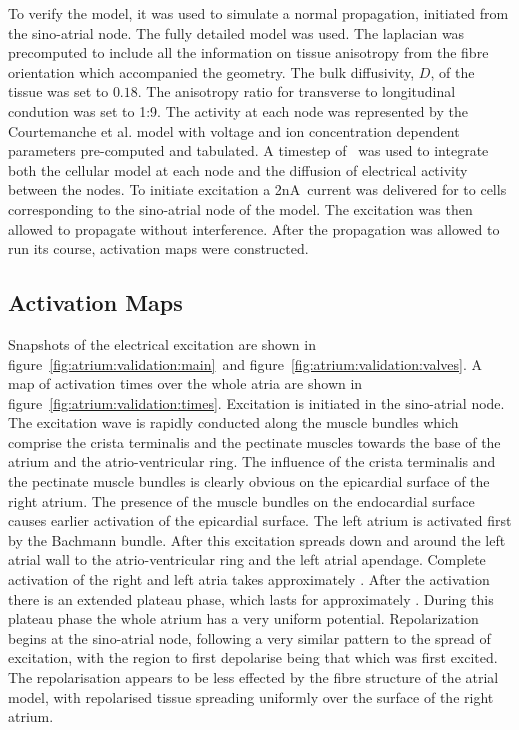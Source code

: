 To verify the model, it was used to simulate a normal propagation, initiated
from the sino-atrial node.
The fully detailed model was used.
The laplacian was precomputed to include all the information on tissue
anisotropy from the fibre orientation which accompanied the geometry.
The bulk diffusivity, $D$, of the tissue was set to $0.18$.
The anisotropy ratio for transverse to longitudinal condution was set to 1:9.
The activity at each node was represented by the Courtemanche et al. model with
voltage and ion concentration dependent parameters pre-computed and tabulated.
A timestep of \ was used to integrate both the cellular model at each
node and the diffusion of electrical activity between the nodes.
To initiate excitation a \unit{2}{nA}\ current was delivered for  to cells
corresponding to the sino-atrial node of the model.
The excitation was then allowed to propagate without interference.
After the propagation was allowed to run its course, activation maps were
constructed.

\subsection{Activation Maps}

Snapshots of the electrical excitation are shown in
figure~\ref{fig:atrium:validation:main}\ and figure~\ref{fig:atrium:validation:valves}.
A map of activation times over the whole atria are shown in
figure~\ref{fig:atrium:validation:times}.
Excitation is initiated in the sino-atrial node.
The excitation wave is rapidly conducted along the muscle bundles which comprise
the crista terminalis and the pectinate muscles towards the base of the atrium
and the atrio-ventricular ring.
The influence of the crista terminalis and the pectinate muscle bundles is
clearly obvious on the epicardial surface of the right atrium.
The presence of the muscle bundles on the endocardial surface causes earlier
activation of the epicardial surface.
The left atrium is activated first by the Bachmann bundle.
After this excitation spreads down and around the left atrial wall to the
atrio-ventricular ring and the left atrial apendage.
Complete activation of the right and left atria takes approximately .
After the activation there is an extended plateau phase, which lasts for
approximately .
During this plateau phase the whole atrium has a very uniform potential.
Repolarization begins at the sino-atrial node, following a very similar pattern
to the spread of excitation, with the region to first depolarise being that
which was first excited.
The repolarisation appears to be less effected by the fibre structure of the
atrial model, with repolarised tissue spreading uniformly over the surface of
the right atrium.

